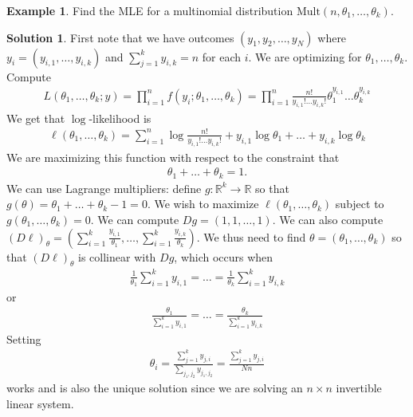 \documentclass[11pt]{amsart}
\theoremstyle{definition}
\newtheorem{example}[theorem]{Example}
\newtheorem{solution}[theorem]{Solution}
\numberwithin{equation}{section}
\begin{document}
\begin{example}\label{multmle}
    Find the MLE for a multinomial distribution $\mathrm{Mult}(n,\theta_1,\ldots,\theta_k)$.
\end{example}
\addtocounter{theorem}{-1}
\begin{solution}
    First note that we have outcomes $(y_1,y_2,\ldots,y_N)$ where $y_i=(y_{i,1},\ldots,y_{i,k})$ and $\sum_{j=1}^ky_{i,k}=n$ for each $i$. We are optimizing for $\theta_1,\ldots,\theta_k$. Compute
    \begin{align*}
        L(\theta_1,\ldots,\theta_k;y)=\prod_{i=1}^nf(y_i;\theta_1,\ldots,\theta_k)=\prod_{i=1}^n\frac{n!}{y_{i,1}!\ldots y_{i,k}!}\theta_1^{y_{i,1}}\ldots\theta_k^{y_{i,k}}
    \end{align*}
    We get that $\log$-likelihood is
    \begin{align*}
        \ell(\theta_1,\ldots,\theta_k)=\sum_{i=1}^n\log\frac{n!}{y_{i,1}!\ldots y_{i,k}!}+y_{i,1}\log\theta_1+\ldots+y_{i,k}\log\theta_k
    \end{align*}
    We are maximizing this function with respect to the constraint that
    \begin{align*}
        \theta_1+\ldots+\theta_k=1.
    \end{align*}
    We can use Lagrange multipliers: define $g:\mathbb R^k\to\mathbb R$ so that $g(\theta)=\theta_1+\ldots+\theta_k-1=0$. We wish to maximize $\ell(\theta_1,\ldots,\theta_k)$ subject to $g(\theta_1,\ldots,\theta_k)=0$. We can compute $Dg=(1, 1, \ldots,1)$. We can also compute $(D\ell)_\theta=(\sum_{i=1}^k\frac{y_{i,1}}{\theta_1},\ldots,\sum_{i=1}^k\frac{y_{i,k}}{\theta_k})$. We thus need to find $\theta=(\theta_1,\ldots,\theta_k)$ so that $(D\ell)_\theta$ is collinear with $Dg$, which occurs when
    \begin{align*}
        \frac{1}{\theta_1}\sum_{i=1}^ky_{i,1}=\ldots=\frac{1}{\theta_k}\sum_{i=1}^ky_{i,k}
    \end{align*}
    or
    \begin{align*}
        \frac{\theta_1}{\sum_{i=1}^ky_{i,1}}=\ldots=\frac{\theta_k}{\sum_{i=1}^ky_{i,k}}
    \end{align*}
    Setting 
    \begin{align*}
        \theta_i=\frac{\sum_{j=1}^ky_{j,i}}{\sum_{j_1,j_2}y_{j_1,j_2}}=\frac{\sum_{j=1}^ky_{j,i}}{Nn}
    \end{align*}
    works and is also the unique solution since we are solving an $n\times n$ invertible linear system.
\end{solution}
\end{document}

